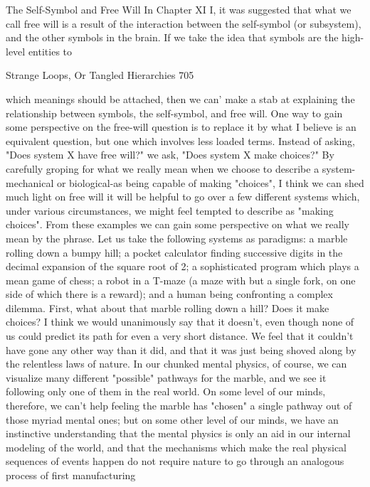                           The Self-Symbol and Free Will
In Chapter XI I, it was suggested that what we call free will is a result of the interaction
between the self-symbol (or subsystem), and the other symbols in the brain. If we take
the idea that symbols are the high-level entities to


Strange Loops, Or Tangled Hierarchies                                                   705

which meanings should be attached, then we can' make a stab at explaining the
relationship between symbols, the self-symbol, and free will.
         One way to gain some perspective on the free-will question is to replace it by
what I believe is an equivalent question, but one which involves less loaded terms.
Instead of asking, "Does system X have free will?" we ask, "Does system X make
choices?" By carefully groping for what we really mean when we choose to describe a
system-mechanical or biological-as being capable of making "choices", I think we can
shed much light on free will it will be helpful to go over a few different systems which,
under various circumstances, we might feel tempted to describe as "making choices".
From these examples we can gain some perspective on what we really mean by the
phrase.
         Let us take the following systems as paradigms: a marble rolling down a bumpy
hill; a pocket calculator finding successive digits in the decimal expansion of the square
root of 2; a sophisticated program which plays a mean game of chess; a robot in a T-maze
(a maze with but a single fork, on one side of which there is a reward); and a human
being confronting a complex dilemma.
         First, what about that marble rolling down a hill? Does it make choices? I think
we would unanimously say that it doesn't, even though none of us could predict its path
for even a very short distance. We feel that it couldn't have gone any other way than it
did, and that it was just being shoved along by the relentless laws of nature. In our
chunked mental physics, of course, we can visualize many different "possible" pathways
for the marble, and we see it following only one of them in the real world. On some level
of our minds, therefore, we can't help feeling the marble has "chosen" a single pathway
out of those myriad mental ones; but on some other level of our minds, we have an
instinctive understanding that the mental physics is only an aid in our internal modeling
of the world, and that the mechanisms which make the real physical sequences of events
happen do not require nature to go through an analogous process of first manufacturing
